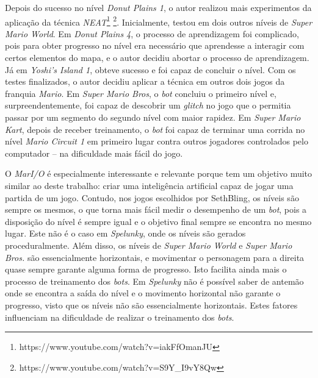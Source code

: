 Depois do sucesso no nível \textit{Donut Plains 1}, o autor realizou mais
experimentos da aplicação da técnica
\textit{NEAT}\footnote{https://www.youtube.com/watch?v=iakFfOmanJU}
\footnote{https://www.youtube.com/watch?v=S9Y\_I9vY8Qw}. Inicialmente, testou em
dois outros níveis de \textit{Super Mario World}. Em \textit{Donut Plains 4}, o
processo de aprendizagem foi complicado, pois para obter progresso no nível era
necessário que aprendesse a interagir com certos elementos do mapa, e o autor
decidiu abortar o processo de aprendizagem. Já em \textit{Yoshi's Island 1},
obteve sucesso e foi capaz de concluir o nível. Com os testes finalizados, o
autor decidiu aplicar a técnica em outros dois jogos da franquia \textit{Mario}.
Em \textit{Super Mario Bros}, o \textit{bot} concluiu o primeiro nível e,
surpreendentemente, foi capaz de descobrir um \textit{glitch} no jogo que o
permitia passar por um segmento do segundo nível com maior rapidez. Em
\textit{Super Mario Kart}, depois de receber treinamento, o \textit{bot} foi
capaz de terminar uma corrida no nível \textit{Mario Circuit 1} em primeiro
lugar contra outros jogadores controlados pelo computador -- na dificuldade mais
fácil do jogo.

O \textit{MarI/O} é especialmente interessante e relevante porque tem um
objetivo muito similar ao deste trabalho: criar uma inteligência artificial
capaz de jogar uma partida de um jogo. Contudo, nos jogos escolhidos por
SethBling, os níveis são sempre os mesmos, o que torna mais fácil medir o
desempenho de um \textit{bot}, pois a disposição do nível é sempre igual e o
objetivo final sempre se encontra no mesmo lugar. Este não é o caso em
\textit{Spelunky}, onde os níveis são gerados proceduralmente. Além disso, os
níveis de \textit{Super Mario World} e \textit{Super Mario Bros.} são
essencialmente horizontais, e movimentar o personagem para a direita quase
sempre garante alguma forma de progresso. Isto facilita ainda mais o processo de
treinamento dos \textit{bots}. Em \textit{Spelunky} não é possível saber de
antemão onde se encontra a saída do nível e o movimento horizontal não garante o
progresso, visto que os níveis não são essencialmente horizontais. Estes fatores
influenciam na dificuldade de realizar o treinamento dos \textit{bots}.
